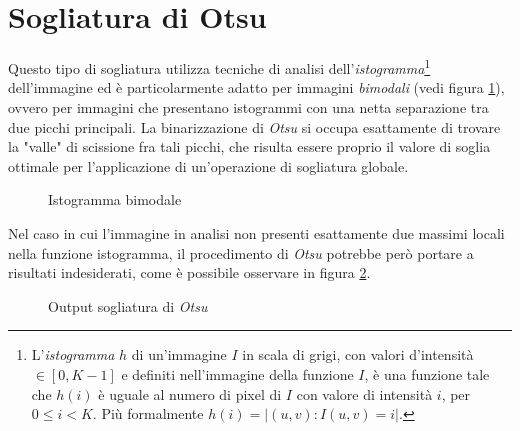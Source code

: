 \section{Sogliatura di Otsu}
\label{sec:image-bin-otsu}
Questo tipo di sogliatura utilizza tecniche di analisi dell'\textit{istogramma}\footnote{L'\textit{istogramma} $h$ di un'immagine $I$ in scala di grigi, con valori d'intensit\`a $\in [0, K - 1]$ e definiti nell'immagine della funzione $I$,  \`e una funzione tale che $h(i)$ \`e uguale al numero di pixel di $I$ con valore di intensit\`a $i$, per $0 \leq i < K$. Pi\`u formalmente $h(i)=|{(u, v)\colon I(u, v)=i}|$.} dell'immagine ed \`e particolarmente adatto per immagini \textit{bimodali} (vedi figura \ref{fig:bimodal-hist}), ovvero per immagini che presentano istogrammi con una netta separazione tra due picchi principali. La binarizzazione di \textit{Otsu} si occupa esattamente di trovare la "valle" di scissione fra tali picchi, che risulta essere proprio il valore di soglia ottimale per l'applicazione di un'operazione di sogliatura globale.\par
\pgfplotsset{compat=1.16,width=13cm,height=7cm}
\begin{figure}[H]
	\centering
	\caption{Istogramma bimodale} \label{fig:bimodal-hist}
\end{figure}
Nel caso in cui l'immagine in analisi non presenti esattamente due massimi locali nella funzione istogramma, il procedimento di \textit{Otsu} potrebbe per\`o portare a risultati indesiderati, come \`e possibile osservare in figura \ref{fig:image-bin-otsu}.
\begin{figure}[H]
	\centering
	\caption{Output sogliatura di \textit{Otsu}}
	\label{fig:image-bin-otsu}
\end{figure}

